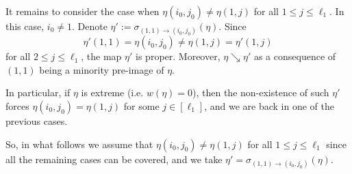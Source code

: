 \documentclass[11pt]{amsart}
\theoremstyle{definition}
\newcommand{\CG}{{\mathcal G}}
\newcommand{\be}{{\mathbf{e}}}
\newcommand{\bu}{{\mathbf{u}}}
\newcommand{\bv}{{\mathbf{v}}}
\newcommand{\1}{{\mathbf{1}}}
\begin{document}
       It remains to consider the case when $\eta(i_{0},j_{0})\neq \eta(1,j)$ for all $1\leq j\leq \ell_1$. In this case,  %
       $i_{0}\neq 1$. 
       Denote $\eta':=\sigma_{(1,1)\to (i_{0},j_{0})}(\eta)$.
     Since 
  $$\eta'(1,1)=\eta(i_{0},j_{0})\neq \eta(1,j)=\eta'(1,j)$$ for all $2\leq j\leq \ell_1$, 
     the map $\eta'$ is proper. Moreover, $\eta\searrow \eta'$ %
     as a consequence of $(1,1)$ being a minority pre-image of $\eta$.

 
     
      In particular, if $\eta$ is extreme (i.e. $w(\eta) = 0$), then the non-existence of such $\eta'$ forces $\eta(i_{0},j_{0})=\eta(1,j)$ for some $j\in[\ell_1]$, and we are back in one of the previous cases. 
      
      So, in what follows we assume that $\eta(i_{0},j_{0})\neq \eta(1,j)$ for all $1\leq j\leq \ell_1$ since all the remaining cases can be covered, and we take $\eta'=\sigma_{(1,1)\to (i_{0},j_{0})}(\eta)$.
      
\end{document}
